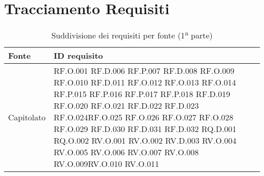 \section{Tracciamento Requisiti}
\begin{table}[H]
\centering
    \begin{tabular}{|C{3.0cm}|C{3.0cm}|}
        \hline
         \textbf{Fonte} &
         \textbf{ID requisito}   
          \\
          \hline
          Capitolato & RF.O.001  \newline RF.D.006 \newline   
                        RF.P.007 \newline  RF.D.008 \newline
                        RF.O.009  \newline RF.O.010 \newline
                        RF.D.011   \newline      RF.O.012 \newline
                        RF.O.013  \newline       RF.O.014 \newline
                        RF.P.015  \newline        RF.P.016 \newline
                        RF.P.017  \newline        RF.P.018 \newline
                        RF.D.019   \newline      RF.O.020 \newline
RF.O.021 \newline RF.D.022 \newline RF.D.023  \newline  RF.O.024\newline RF.O.025 \newline
RF.O.026 \newline RF.O.027  \newline RF.O.028  \newline  RF.O.029 \newline RF.D.030 \newline RF.D.031 \newline RF.D.032 \newline
RQ.D.001 \newline RQ.O.002 \newline 
RV.O.001 \newline RV.O.002  \newline RV.D.003   \newline  RV.O.004   \newline RV.O.005 \newline
RV.O.006 \newline RV.O.007 \newline RV.O.008  \newline  RV.O.009\newline RV.O.010 \newline
RV.O.011 \\
\hline
    \end{tabular}
    \caption{Suddivisione dei requisiti per fonte (1\textsuperscript{a} parte)}
\end{table}
